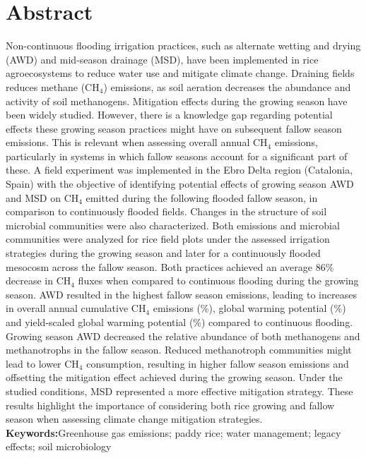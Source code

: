 \section*{Abstract}
Non-continuous flooding irrigation practices, such as alternate wetting and drying (AWD) and mid-season drainage (MSD), have been implemented in rice agroecosystems to reduce water use and mitigate climate change. Draining fields reduces methane (CH$_{4}$) emissions, as soil aeration decreases the abundance and activity of soil methanogens. Mitigation effects during the growing season have been widely studied. However, there is a knowledge gap regarding potential effects these growing season practices might have on subsequent fallow season emissions. This is relevant when assessing overall annual CH$_{4}$ emissions, particularly in systems in which fallow seasons account for a significant part of these. A field experiment was implemented in the Ebro Delta region (Catalonia, Spain) with the objective of identifying potential effects of growing season AWD and MSD on CH$_{4}$ emitted during the following flooded fallow season, in comparison to continuously flooded fields. Changes in the structure of soil microbial communities were also characterized. Both emissions and microbial communities were analyzed for rice field plots under the assessed irrigation strategies during the growing season and later for a continuously flooded mesocosm across the fallow season. Both practices achieved an average 86\% decrease in CH$_{4}$ fluxes when compared to continuous flooding during the growing season. AWD resulted in the highest fallow season emissions, leading to increases in overall annual cumulative CH$_{4}$ emissions (\%), global warming potential (\%) and yield-scaled global warming potential (\%) compared to continuous flooding. Growing season AWD decreased the relative abundance of both methanogens and methanotrophs in the fallow season. Reduced methanotroph communities might lead to lower CH$_{4}$ consumption, resulting in higher fallow season emissions and offsetting the mitigation effect achieved during the growing season. Under the studied conditions, MSD represented a more effective mitigation strategy. These results highlight the importance of considering both rice growing and fallow season when assessing climate change mitigation strategies.\\ 


\noindent\textbf{Keywords:}Greenhouse gas emissions; paddy rice; water management; legacy effects; soil microbiology 

